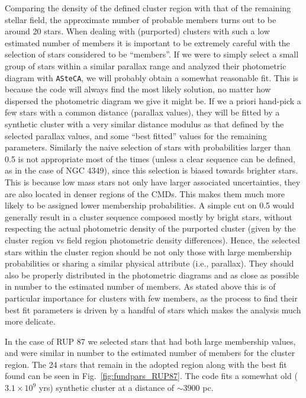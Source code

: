 \documentclass[draft]{aa}
\begin{document}
Comparing the density of the defined cluster region with that of the
remaining stellar field, the approximate number of probable members turns out
to be around 20 stars.
%
When dealing with (purported) clusters with such a low estimated number of
members it is important to be extremely careful with the selection of stars
considered to be ``members''. If we were to simply select a small group
of stars within a similar parallax range and analyzed their photometric
diagram with \texttt{ASteCA}, we will probably obtain a somewhat reasonable
fit. This is because the code will always find the most likely solution,
no matter how dispersed the photometric diagram we give it might be. If we a
priori hand-pick a few stars with a common distance (parallax values), they
will be fitted by a synthetic cluster with a very similar distance modulus as
that defined by the selected parallax values, and some ``best fitted'' values
for the remaining parameters.
%
Similarly the naive selection of stars with probabilities larger than 0.5 is
not appropriate most of the times (unless a clear sequence can
be defined, as in the case of NGC 4349), since this selection is biased
towards brighter stars.
This is because low mass stars not only have larger associated uncertainties,
they are also located in denser regions of the CMDs. This makes them much more
likely to be assigned lower membership probabilities. A simple cut on 0.5
would generally result in a cluster sequence composed mostly by bright stars,
without respecting the actual photometric density of the purported cluster 
(given by the cluster region vs field region photometric density differences).
%
Hence, the selected stars within the cluster region should be not only those
with large membership probabilities or sharing a similar physical attribute 
(i.e., parallax). They should also be properly distributed in the photometric
diagrams and as close as possible in number to the estimated number of members.
As stated above this is of particular importance for clusters with few members,
as the process to find their best fit parameters is driven by a handful of
stars which makes the analysis much more delicate.

In the case of RUP 87 we selected stars that had both large membership
values, and were similar in number to the estimated number of members for the
cluster region. The 24 stars that remain in the adopted region along with the
best fit found can be seen in Fig.~\ref{fig:fundpars_RUP87}. The code fits a
somewhat old ($3.1\times10^9$ yrs) synthetic cluster at a distance of
$\sim3900$ pc.\\
\end{document}
